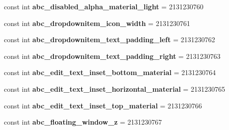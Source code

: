 \begin{DoxyCompactItemize}
\item 
\mbox{\label{classst_delivery_1_1_resource_1_1_dimension_a119f874c5ce9e88d43545691b81e68b6}} 
const int {\bfseries abc\+\_\+disabled\+\_\+alpha\+\_\+material\+\_\+light} = 2131230760
\item 
\mbox{\label{classst_delivery_1_1_resource_1_1_dimension_a8a151352581d17c2ee840787e599b740}} 
const int {\bfseries abc\+\_\+dropdownitem\+\_\+icon\+\_\+width} = 2131230761
\item 
\mbox{\label{classst_delivery_1_1_resource_1_1_dimension_afee8d01ec91a3eac1119be2157d5a51d}} 
const int {\bfseries abc\+\_\+dropdownitem\+\_\+text\+\_\+padding\+\_\+left} = 2131230762
\item 
\mbox{\label{classst_delivery_1_1_resource_1_1_dimension_af7dbd6719ff5599ccbfeb88ce3b6dc20}} 
const int {\bfseries abc\+\_\+dropdownitem\+\_\+text\+\_\+padding\+\_\+right} = 2131230763
\item 
\mbox{\label{classst_delivery_1_1_resource_1_1_dimension_a25a4a7ceaa321fb4d8c8d4e61b70296b}} 
const int {\bfseries abc\+\_\+edit\+\_\+text\+\_\+inset\+\_\+bottom\+\_\+material} = 2131230764
\item 
\mbox{\label{classst_delivery_1_1_resource_1_1_dimension_a7a932938266564eac964eabeac7750cd}} 
const int {\bfseries abc\+\_\+edit\+\_\+text\+\_\+inset\+\_\+horizontal\+\_\+material} = 2131230765
\item 
\mbox{\label{classst_delivery_1_1_resource_1_1_dimension_a48125430d69ae18d8a7b1606fbae1e81}} 
const int {\bfseries abc\+\_\+edit\+\_\+text\+\_\+inset\+\_\+top\+\_\+material} = 2131230766
\item 
\mbox{\label{classst_delivery_1_1_resource_1_1_dimension_abc723dd8d693c4f20a667d648f7fbdf3}} 
const int {\bfseries abc\+\_\+floating\+\_\+window\+\_\+z} = 2131230767
\item 

\end{DoxyCompactItemize}

